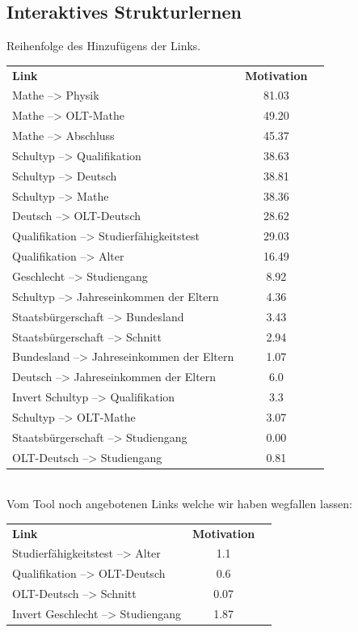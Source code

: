 \subsection{Interaktives Strukturlernen}\label{interactive}
Reihenfolge des Hinzufügens der Links.\\
 \hspace*{3mm}
 \begin{tabular}{lcr}
  \textbf{Link} & \textbf{Motivation} \\
  Mathe --> Physik & 81.03 \\
  Mathe --> OLT-Mathe & 49.20 \\
  Mathe --> Abschluss & 45.37 \\
  Schultyp --> Qualifikation & 38.63 \\
  Schultyp --> Deutsch & 38.81 \\
  Schultyp --> Mathe & 38.36 \\
  Deutsch --> OLT-Deutsch & 28.62 \\
  Qualifikation --> Studierfähigkeitstest & 29.03 \\
  Qualifikation --> Alter & 16.49 \\ %
  Geschlecht --> Studiengang & 8.92 \\
  Schultyp --> Jahreseinkommen der Eltern & 4.36 \\
  Staatsbürgerschaft --> Bundesland & 3.43 \\
  Staatsbürgerschaft --> Schnitt & 2.94 \\
  Bundesland --> Jahreseinkommen der Eltern & 1.07 \\
  Deutsch --> Jahreseinkommen der Eltern & 6.0 \\
  Invert Schultyp --> Qualifikation & 3.3\\ 
  Schultyp --> OLT-Mathe & 3.07\\
  Staatsbürgerschaft --> Studiengang &  0.00 \\
  OLT-Deutsch --> Studiengang & 0.81
 \end{tabular}
 \\

Vom Tool noch angebotenen Links welche wir haben wegfallen lassen: \\
 \hspace*{3mm}
 \begin{tabular}{lcr}
  \textbf{Link} & \textbf{Motivation} \\
  Studierfähigkeitstest --> Alter & 1.1  \\
  Qualifikation --> OLT-Deutsch & 0.6 \\
  OLT-Deutsch --> Schnitt & 0.07 \\
  Invert Geschlecht --> Studiengang & 1.87
 \end{tabular}
 
 